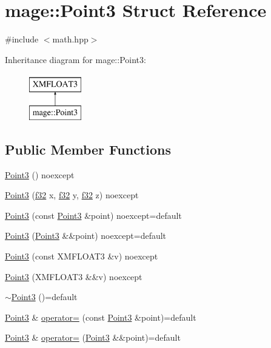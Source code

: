 \hypertarget{structmage_1_1_point3}{}\section{mage\+:\+:Point3 Struct Reference}
\label{structmage_1_1_point3}


{\ttfamily \#include $<$math.\+hpp$>$}

Inheritance diagram for mage\+:\+:Point3\+:\begin{figure}[H]
\begin{center}
\leavevmode
\includegraphics[height=2.000000cm]{structmage_1_1_point3}
\end{center}
\end{figure}
\subsection*{Public Member Functions}
\begin{DoxyCompactItemize}
\item 
\hyperlink{structmage_1_1_point3_aab371cb187cadc61b81e5d09c8eed1e5}{Point3} () noexcept
\item 
\hyperlink{structmage_1_1_point3_a554f2608040c6a715f36cb0fe862de1c}{Point3} (\hyperlink{namespacemage_a6a44ad388483959dc4dff9f2aef91431}{f32} x, \hyperlink{namespacemage_a6a44ad388483959dc4dff9f2aef91431}{f32} y, \hyperlink{namespacemage_a6a44ad388483959dc4dff9f2aef91431}{f32} z) noexcept
\item 
\hyperlink{structmage_1_1_point3_a06dfbaee1e7bc857d95c60ce970eb9bd}{Point3} (const \hyperlink{structmage_1_1_point3}{Point3} \&point) noexcept=default
\item 
\hyperlink{structmage_1_1_point3_a42d100496c00031d597f00da9057b221}{Point3} (\hyperlink{structmage_1_1_point3}{Point3} \&\&point) noexcept=default
\item 
\hyperlink{structmage_1_1_point3_a301b7497bfdc583b0157d4dcb10e0984}{Point3} (const X\+M\+F\+L\+O\+A\+T3 \&v) noexcept
\item 
\hyperlink{structmage_1_1_point3_a56b75e7d5d8803ffd2c3b11f087816d1}{Point3} (X\+M\+F\+L\+O\+A\+T3 \&\&v) noexcept
\item 
\hyperlink{structmage_1_1_point3_a952151b6ff72b68569f95445c2ac2495}{$\sim$\+Point3} ()=default
\item 
\hyperlink{structmage_1_1_point3}{Point3} \& \hyperlink{structmage_1_1_point3_a9b2178183cdb9e8d1ab6eaf9702b0786}{operator=} (const \hyperlink{structmage_1_1_point3}{Point3} \&point)=default
\item 
\hyperlink{structmage_1_1_point3}{Point3} \& \hyperlink{structmage_1_1_point3_ab3a12f78a196535f25269e1288b10a06}{operator=} (\hyperlink{structmage_1_1_point3}{Point3} \&\&point)=default
\end{DoxyCompactItemize}


